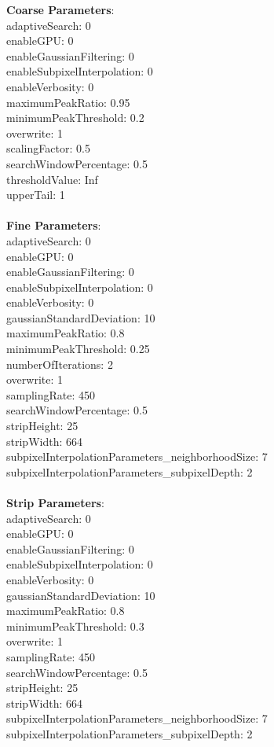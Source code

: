 \documentclass[11pt]{article}
\begin{document}
\textbf{Coarse Parameters}: \\
adaptiveSearch: 0\\
enableGPU: 0\\
enableGaussianFiltering: 0\\
enableSubpixelInterpolation: 0\\
enableVerbosity: 0\\
maximumPeakRatio: 0.95\\
minimumPeakThreshold: 0.2\\
overwrite: 1\\
scalingFactor: 0.5\\
searchWindowPercentage: 0.5\\
thresholdValue: Inf\\
upperTail: 1\\
\\
\textbf{Fine Parameters}: \\
adaptiveSearch: 0\\
enableGPU: 0\\
enableGaussianFiltering: 0\\
enableSubpixelInterpolation: 0\\
enableVerbosity: 0\\
gaussianStandardDeviation: 10\\
maximumPeakRatio: 0.8\\
minimumPeakThreshold: 0.25\\
numberOfIterations: 2\\
overwrite: 1\\
samplingRate: 450\\
searchWindowPercentage: 0.5\\
stripHeight: 25\\
stripWidth: 664\\
subpixelInterpolationParameters\_neighborhoodSize: 7\\
subpixelInterpolationParameters\_subpixelDepth: 2\\
\\
\textbf{Strip Parameters}: \\
adaptiveSearch: 0\\
enableGPU: 0\\
enableGaussianFiltering: 0\\
enableSubpixelInterpolation: 0\\
enableVerbosity: 0\\
gaussianStandardDeviation: 10\\
maximumPeakRatio: 0.8\\
minimumPeakThreshold: 0.3\\
overwrite: 1\\
samplingRate: 450\\
searchWindowPercentage: 0.5\\
stripHeight: 25\\
stripWidth: 664\\
subpixelInterpolationParameters\_neighborhoodSize: 7\\
subpixelInterpolationParameters\_subpixelDepth: 2\\
\\
\newpage
\end{document}
